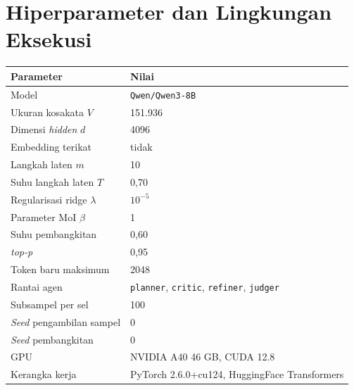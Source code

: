 \chapter{Hiperparameter dan Lingkungan Eksekusi}
\label{lamp:hparam}

\begin{longtable}{ll}
\hline
Parameter & Nilai \\
\hline\endhead
Model & \texttt{Qwen/Qwen3-8B} \\
Ukuran kosakata $V$ & 151.936 \\
Dimensi \textit{hidden} $d$ & 4096 \\
Embedding terikat & tidak \\
Langkah laten $m$ & 10 \\
Suhu langkah laten $T$ & 0,70 \\
Regularisasi ridge $\lambda$ & $10^{-5}$ \\
Parameter MoI $\beta$ & 1 \\
Suhu pembangkitan & 0,60 \\
\textit{top-p} & 0,95 \\
Token baru maksimum & 2048 \\
Rantai agen & \texttt{planner}, \texttt{critic}, \texttt{refiner}, \texttt{judger} \\
Subsampel per sel & 100 \\
\textit{Seed} pengambilan sampel & 0 \\
\textit{Seed} pembangkitan & 0 \\
GPU & NVIDIA A40 46 GB, CUDA 12.8 \\
Kerangka kerja & PyTorch 2.6.0+cu124, HuggingFace Transformers \\
\hline
\end{longtable}
